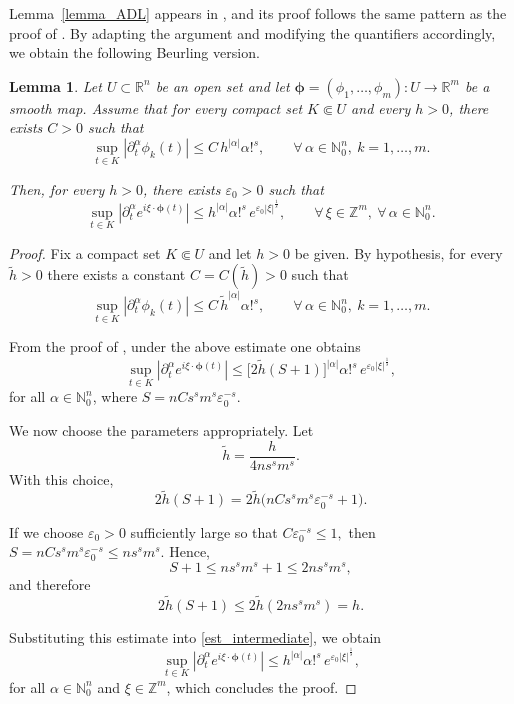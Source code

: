 \documentclass[11pt,reqno]{amsart}
\numberwithin{equation}{section}
\newtheorem{lemma}[theorem]{Lemma}
\begin{document}
	Lemma~\ref{lemma_ADL} appears in \cite[Lemma~6.1]{ADL2023gh}, and its proof follows the same pattern as the proof of \cite[Lemma~4.3]{DM2020}. 
	By adapting the argument and modifying the quantifiers accordingly, we obtain the following Beurling version.


	\begin{lemma}\label{lemma_ADL_beurling}
		Let $U\subset\mathbb{R}^n$ be an open set and let 
		$\boldsymbol{\phi}=(\phi_1,\dots,\phi_m):U\to\mathbb{R}^m$ 
		be a smooth map. 
		Assume that for every compact set $K\Subset U$ and every $h>0$, 
		there exists $C>0$ such that
		\[
		\sup_{t\in K} |\partial_t^\alpha \phi_k(t)| \le C\, h^{|\alpha|}\alpha!^s, \qquad \forall\, \alpha\in\mathbb{N}_0^n,\  k=1,\dots,m.
		\]
		
		Then, for every $h>0$, there exists $\varepsilon_0>0$ such that
		\[
		\sup_{t\in K} |\partial_t^\alpha e^{i\xi\cdot\boldsymbol{\phi}(t)}| 
		\le h^{|\alpha|}\alpha!^s \, e^{\varepsilon_0|\xi|^{\frac{1}{s}}},
		\qquad \forall\,\xi\in\mathbb{Z}^m,\ \forall\,\alpha\in\mathbb{N}_0^n.
		\]
	\end{lemma}
	\begin{proof}
		Fix a compact set $K\Subset U$ and let $h>0$ be given. By hypothesis, for every $\tilde h>0$ there exists a constant $C=C(\tilde h)>0$ such that
		\[
		\sup_{t\in K} |\partial_t^\alpha \phi_k(t)| \le C\, \tilde h^{|\alpha|}\alpha!^s,
		\qquad 	\forall\, \alpha\in\mathbb{N}_0^n, \ k=1,\dots,m.
		\]
		
		From the proof of \cite[Lemma~4.3]{DM2020}, under the above estimate one obtains
		\begin{equation}\label{est_intermediate}
			\sup_{t\in K} |\partial_t^\alpha e^{i\xi\cdot\boldsymbol{\phi}(t)}| 
			\le \big[2\tilde h (S+1)\big]^{|\alpha|} \alpha!^s 	\,  e^{\varepsilon_0|\xi|^{\frac{1}{s}}},
		\end{equation}
		for all $\alpha\in\mathbb{N}_0^n$,  where $S = n C s^s m^s \varepsilon_0^{-s}.$
		
		We now choose the parameters appropriately. 
		Let
		\[
		\tilde h = \frac{h}{4 n s^s m^s}.
		\]
		With this choice,
		\[
		2\tilde h (S+1) = 2\tilde h \big(n C s^s m^s \varepsilon_0^{-s} + 1\big).
		\]
		
		If we choose $\varepsilon_0>0$ sufficiently large so that $C \varepsilon_0^{-s} \le 1,$ then $S = n C s^s m^s \varepsilon_0^{-s} 	\le n s^s m^s.$	Hence,
		\[
		S+1 \le n s^s m^s + 1 \le 2 n s^s m^s, 
		\]
		and therefore
		\[
		2\tilde h (S+1) \le 2\tilde h (2 n s^s m^s) = h.
		\]
		
		Substituting this estimate into \eqref{est_intermediate},  we obtain
		\[
		\sup_{t\in K} |\partial_t^\alpha e^{i\xi\cdot\boldsymbol{\phi}(t)}|
		\le h^{|\alpha|} \alpha!^s \, e^{\varepsilon_0|\xi|^{\frac{1}{s}}},
		\]
		for all $\alpha\in\mathbb{N}_0^n$ and $\xi\in\mathbb{Z}^m$, which concludes the proof.
	\end{proof}
	
\end{document}
